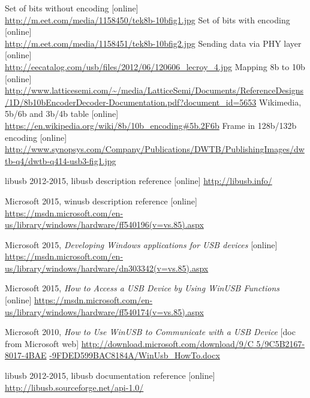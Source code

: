 \documentclass{BscUS}
\begin{document}
\begin{thebibliography}{1}
 Set of bits without encoding [online] \\
\url{http://m.eet.com/media/1158450/tek8b-10bfig1.jpg}
 Set of bits with encoding [online] \\
\url{http://m.eet.com/media/1158451/tek8b-10bfig2.jpg}
 Sending data via PHY layer [online] \\
\url{http://eecatalog.com/usb/files/2012/06/120606_lecroy_4.jpg}
 Mapping 8b to 10b [online] \\
\url{http://www.latticesemi.com/~/media/LatticeSemi/Documents/ReferenceDesigns/1D/8b10bEncoderDecoder-Documentation.pdf?document_id=5653}
 Wikimedia, 5b/6b and 3b/4b table [online] \\
\url{https://en.wikipedia.org/wiki/8b/10b_encoding#5b.2F6b}
 Frame in 128b/132b encoding [online] \\
\url{http://www.synopsys.com/Company/Publications/DWTB/PublishingImages/dwtb-q4/dwtb-q414-usb3-fig1.jpg}

 libusb 2012-2015, libusb description reference [online]
\newline 
\url{http://libusb.info/}

 Microsoft 2015, winusb description reference [online]
\newline 
\url{https://msdn.microsoft.com/en-us/library/windows/hardware/ff540196(v=vs.85).aspx}


 Microsoft 2015, {\em Developing Windows applications for USB devices} [online]
\newline 
\url{https://msdn.microsoft.com/en-us/library/windows/hardware/dn303342(v=vs.85).aspx}

 Microsoft 2015, {\em How to Access a USB Device by Using WinUSB Functions} [online]
\newline 
\url{https://msdn.microsoft.com/en-us/library/windows/hardware/ff540174(v=vs.85).aspx}

 Microsoft 2010, {\em How to Use WinUSB to Communicate with a USB Device} [doc from Microsoft web]
\newline 
\url{http://download.microsoft.com/download/9/C 5/9C5B2167-8017-4BAE} 
\newline 
\url{-9FDED599BAC8184A/WinUsb_HowTo.docx}


 libusb 2012-2015, libusb documentation reference [online]
\newline 
\url{http://libusb.sourceforge.net/api-1.0/}



\end{thebibliography}
\end{document}
